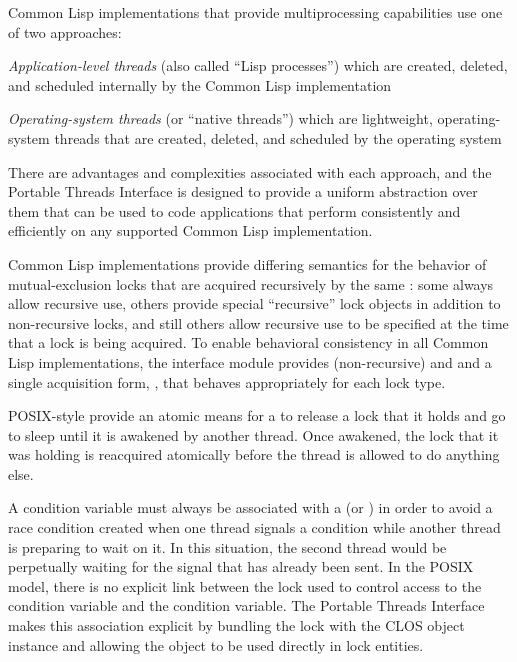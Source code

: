 \documentclass[10pt,twoside,english,pdftex]{article}
\begin{document}

Common Lisp implementations that provide multiprocessing capabilities use one
of two approaches:
\begin{tightitemize}
\item \textit{Application-level threads\/} (also called ``Lisp processes'') which are
  created, deleted, and scheduled internally by the Common Lisp implementation
\item \textit{Operating-system threads\/} (or ``native threads'') which are
  lightweight, operating-system threads that are created, deleted, and
  scheduled by the operating system
\end{tightitemize}

There are advantages and complexities associated with each approach, and the
Portable Threads Interface is designed to provide a uniform abstraction over
them that can be used to code applications that perform consistently and
efficiently on any supported Common Lisp implementation.


Common Lisp implementations provide differing semantics for the behavior of
mutual-exclusion locks that are acquired recursively by the same
: some always allow recursive use, others provide special
``recursive'' lock objects in addition to non-recursive locks, and still
others allow recursive use to be specified at the time that a lock is being
acquired.  To enable behavioral consistency in all Common Lisp
implementations, the  interface module provides
(non-recursive)  and  and a single
acquisition form, \textbf{}, that behaves
appropriately for each lock type.


POSIX-style  provide an atomic means for a
 to release a lock that it holds and go to sleep until it is
awakened by another thread.  Once awakened, the lock that it was holding is
reacquired atomically before the thread is allowed to do anything else.

A condition variable must always be associated with a  (or
) in order to avoid a race condition created when one
thread signals a condition while another thread is preparing to wait on it.
In this situation, the second thread would be perpetually waiting for the
signal that has already been sent.  In the POSIX model, there is no explicit
link between the lock used to control access to the condition variable and the
condition variable.  The Portable Threads Interface makes this association
explicit by bundling the lock with the \textbf{}
CLOS object instance and allowing the \textbf{}
object to be used directly in lock entities.
\end{document}
